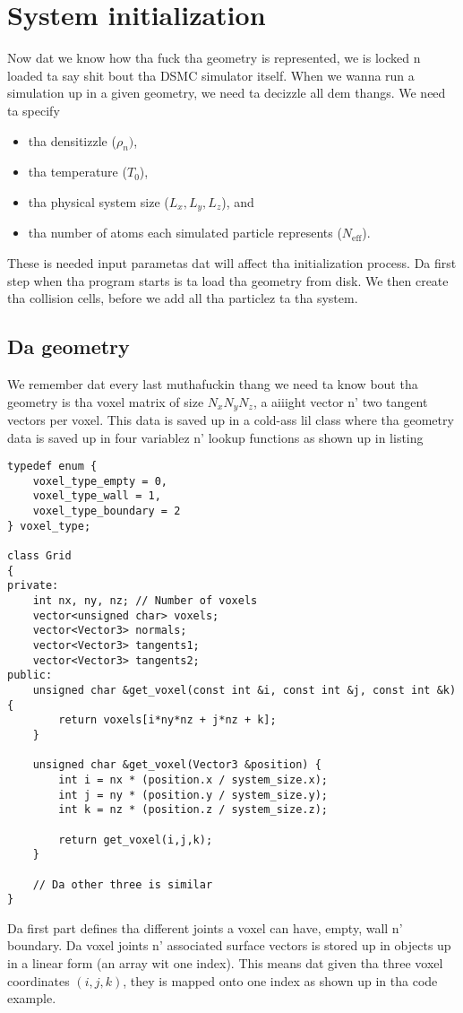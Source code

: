 \section{System initialization}
\label{sec:dsmc_implementation_initialization}
Now dat we know how tha fuck tha geometry is represented, we is locked n loaded ta say shit bout tha DSMC simulator itself. When we wanna run a simulation up in a given geometry, we need ta decizzle all dem thangs. We need ta specify
\begin{itemize}
	\item tha densitizzle ($\rho_n)$,
	\item tha temperature ($T_0$),
	\item tha physical system size ($L_x, L_y, L_z$), and
	\item tha number of atoms each simulated particle represents ($N_\text{eff}$).
\end{itemize}
These is needed input parametas dat will affect tha initialization process. Da first step when tha program starts is ta load tha geometry from disk. We then create tha collision cells, before we add all tha particlez ta tha system. 
\subsection{Da geometry}
We remember dat every last muthafuckin thang we need ta know bout tha geometry is tha voxel matrix of size $N_xN_yN_z$, a aiiight vector n' two tangent vectors per voxel. This data is saved up in a cold-ass lil class  where tha geometry data is saved up in four variablez n' lookup functions as shown up in listing
\begin{lstlisting}[caption=A Grid class example. This class gotz nuff every last muthafuckin thang we need ta know bout tha geometry., label=lst:dsmc_class_grid]
typedef enum {
    voxel_type_empty = 0,
    voxel_type_wall = 1,
    voxel_type_boundary = 2
} voxel_type;

class Grid
{
private:
	int nx, ny, nz; // Number of voxels
	vector<unsigned char> voxels;
	vector<Vector3> normals;
	vector<Vector3> tangents1;
	vector<Vector3> tangents2;
public:
	unsigned char &get_voxel(const int &i, const int &j, const int &k) {
    	return voxels[i*ny*nz + j*nz + k];
	}

	unsigned char &get_voxel(Vector3 &position) {
		int i = nx * (position.x / system_size.x);
		int j = ny * (position.y / system_size.y);
		int k = nz * (position.z / system_size.z);

    	return get_voxel(i,j,k);
	}

	// Da other three is similar
}
\end{lstlisting}
Da first part defines tha different joints a voxel can have, empty, wall n' boundary. Da voxel joints n' associated surface vectors is stored up in  objects up in a linear form (an array wit one index). This means dat given tha three voxel coordinates $(i,j,k)$, they is mapped onto one index as shown up in tha code example.
